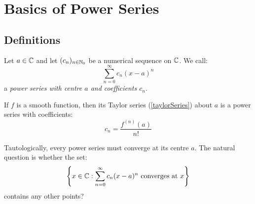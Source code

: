 \documentclass[../main.tex]{subfiles}
\begin{document}
\section{Basics of Power Series}
\subsection{Definitions}
\begin{definition}
  Let $a \in \mathbb{C}$ and let $(c_n)_{n \in \mathbb{N}_0}$ be a numerical sequence on $\mathbb{C}$.
  We call:
  \[
    \sum_{n = 0}^{\infty} c_n(x - a)^{n}
  \]
  a \textit{power series with centre $a$ and coefficients $c_n$}.
\end{definition}
\begin{example}
  If $f$ is a smooth function, then its Taylor series (\cref{taylorSeries}) about $a$ is a power series with coefficients:
  \[
    c_n = \frac{f^{(n)}(a)}{n!}
  \]
\end{example}
Tautologically, every power series must converge at its centre $a$.
The natural question is whether the set:
\[
  \left\{x \in \mathbb{C}: \sum_{n = 0}^{\infty} c_n(x - a)^{n} \text{ converges at $x$}\right\}
\]
contains any other points?
\end{document}
